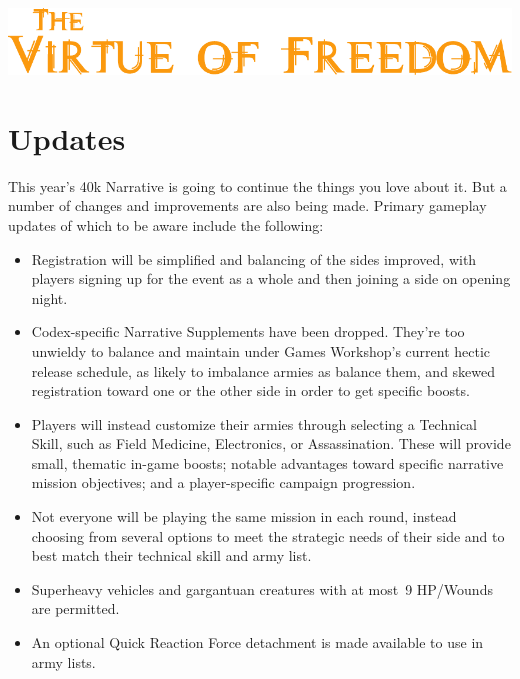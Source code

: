 \documentclass{novanarrative}
\begin{document}
\bigskip
\centerline{\includegraphics{art/title/title.pdf}}

\section{Updates}

This year's 40k Narrative is going to continue the things you love
about it.  But a number of changes and improvements are also being
made.  Primary gameplay updates of which to be aware include the
following:

\begin{itemize}

\item Registration will be simplified and balancing of the sides
  improved, with players signing up for the event as a whole and then
  joining a side on opening night.

\item Codex-specific Narrative Supplements have been dropped.  They're
  too unwieldy to balance and maintain under Games Workshop's current
  hectic release schedule, as likely to imbalance armies as balance
  them, and skewed registration toward one or the other side in order
  to get specific boosts.

\item Players will instead customize their armies through selecting a
  Technical Skill, such as Field Medicine, Electronics, or
  Assassination.  These will provide small, thematic in-game boosts;
  notable advantages toward specific narrative mission objectives; and
  a player-specific campaign progression.

\item Not everyone will be playing the same mission in each round,
  instead choosing from several options to meet the strategic needs of
  their side and to best match their technical skill and army list.

\item Superheavy vehicles and gargantuan creatures with at most~9
  HP/Wounds are permitted.

\item An optional Quick Reaction Force detachment is made available to
  use in army lists.
\end{itemize}
\end{document}
